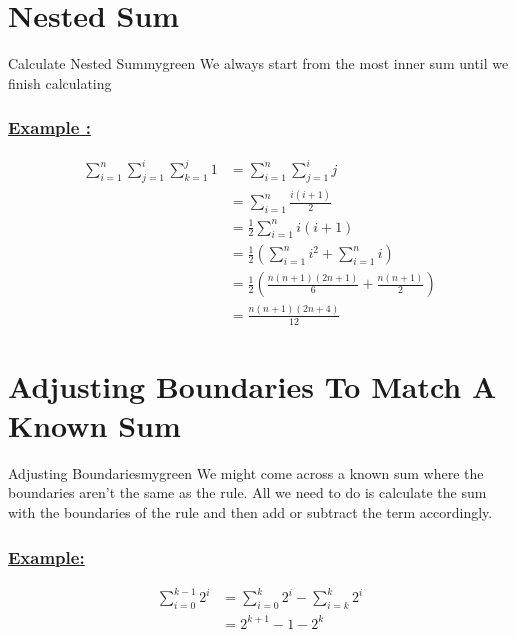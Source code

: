 \section{Nested Sum}

\begin{prettyBox}{Calculate Nested Sum}{mygreen}
We always start from the most inner sum until we finish calculating 
\end{prettyBox}

\vspace{0.25cm}
\subsubsection*{\underline{Example :}}
\begin{align*}
    \sum_{i=1}^{n} \sum_{j=1}^{i} \sum_{k=1}^{j} 1 &= \sum_{i=1}^{n} \sum_{j=1}^i j\\[0.15cm] 
                                                   &= \sum_{i=1}^{n} \frac{i(i+1)}{2}\\[0.15cm]
                                                   &= \frac{1}{2}\sum_{i=1}^{n} i(i+1)\\[0.15cm]
                                                   &= \frac{1}{2}(\sum_{i=1}^{n} i^2 + \sum_{i=1}^{n} i)\\[0.15cm]
                                                   &= \frac{1}{2}(\frac{n(n+1)(2n+1)}{6} + \frac{n(n+1)}{2})\\[0.15cm]
                                                 &=\frac{n(n+1)(2n+4)}{12}
\end{align*}

\vspace{0.5cm}
\newpage
\section{Adjusting Boundaries To Match A Known Sum}
\begin{prettyBox}{Adjusting Boundaries}{mygreen}
We might come across a known sum where the boundaries aren't the same as the rule.
All we need to do is calculate the sum with the boundaries of the rule and then add
or subtract the term accordingly.
\end{prettyBox}

\subsubsection*{\underline{Example:}}
\begin{align*}
    \sum_{i=0}^{k-1} 2^i &= \sum_{i=0}^{k} 2^i - \sum_{i=k}^{k} 2^i \\[0.15cm]
                          &= 2^{k+1} - 1 - 2^{k}
\end{align*}

